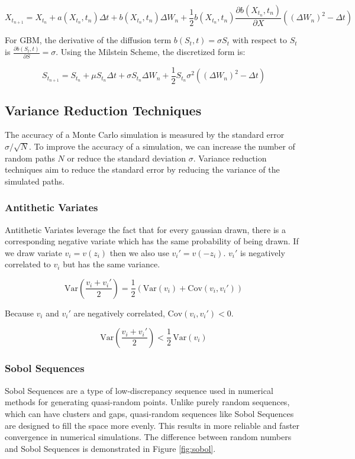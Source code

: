 \documentclass{article}
\begin{document}
\[
X_{t_{n+1}} = X_{t_n} + a(X_{t_n}, t_n) \Delta t + b(X_{t_n}, t_n) \Delta W_n + \frac{1}{2} b(X_{t_n}, t_n) \frac{\partial b(X_{t_n}, t_n)}{\partial X} \left( (\Delta W_n)^2 - \Delta t \right)
\]

For GBM, the derivative of the diffusion term $b(S_t, t) = \sigma S_t$ with respect to $S_t$ is $\frac{\partial b(S_t, t)}{\partial S} = \sigma$. Using the Milstein Scheme, the discretized form is:

\[
S_{t_{n+1}} = S_{t_n} + \mu S_{t_n} \Delta t + \sigma S_{t_n} \Delta W_n + \frac{1}{2} S_{t_n} \sigma^2 \left( (\Delta W_n)^2 - \Delta t \right)
\]

\newpage
\subsection{Variance Reduction Techniques}

The accuracy of a Monte Carlo simulation is measured by the standard error $\sigma / \sqrt{N}$. To improve the accuracy of a simulation, we can increase the number 
of random paths $N$ or reduce the standard deviation $\sigma$. Variance reduction techniques aim to reduce the standard error by reducing the variance of the simulated paths.

\subsubsection{Antithetic Variates}

Antithetic Variates leverage the fact that for every gaussian drawn, there is a corresponding negative variate which 
has the same probability of being drawn. If we draw variate $v_i = v(z_i)$ then we also use $v_i' = v(-z_i)$. $v_i'$ 
is negatively correlated to $v_i$ but has the same variance.\cite{jackel}

\[
\text{Var}\left( \frac{v_i + v_i'}{2} \right) = \frac{1}{2} \left( \text{Var}(v_i) + \text{Cov}(v_i, v_i') \right)
\]

Because $v_i$ and $v_i'$ are negatively correlated, $\text{Cov}(v_i, v_i') < 0$.

\[
\text{Var}\left( \frac{v_i + v_i'}{2} \right) < \frac{1}{2} \, \text{Var}(v_i)
\]

\subsubsection{Sobol Sequences}

Sobol Sequences are a type of low-discrepancy sequence used in numerical methods for generating quasi-random points. 
Unlike purely random sequences, which can have clusters and gaps, quasi-random sequences like Sobol Sequences are designed 
to fill the space more evenly. This results in more reliable and faster convergence in numerical simulations. The difference between
random numbers and Sobol Sequences is demonstrated in Figure \ref{fig:sobol}.
\end{document}
